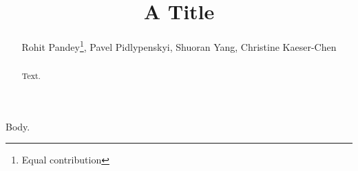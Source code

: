 \documentclass{llncs}
\makeatletter
\newcommand{\printfnsymbol}[1]{\textsuperscript{\@fnsymbol{#1}}}
\makeatother
\begin{document}
\title{A Title}
\author{Rohit Pandey\thanks{Equal contribution}, Pavel Pidlypenskyi\printfnsymbol{1}, Shuoran Yang, Christine Kaeser-Chen}
\maketitle
\begin{abstract}Text.\end{abstract}
Body.
\end{document}
